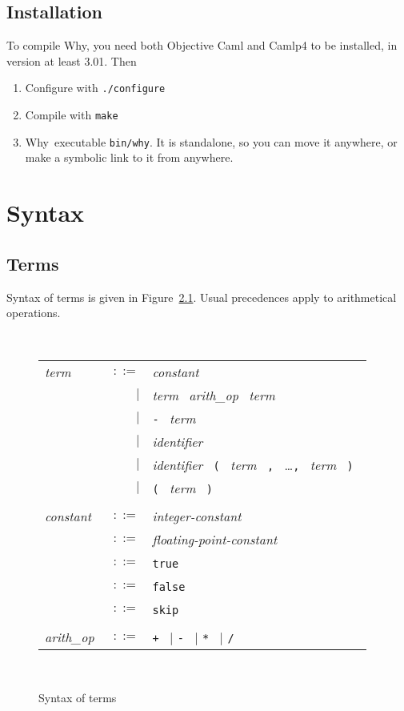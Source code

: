 \documentclass[12pt]{report}
\newcommand{\why}{\textsf{Why}}
\newcommand{\te}[1]{\texttt{#1}~}
\newcommand{\nt}[1]{\textsl{#1}~}
\begin{document}
\section{Installation}

To compile \why, you need both \textsf{Objective Caml} and
\textsf{Camlp4} to be installed, in version at least 3.01.
Then 

\begin{enumerate}
\item Configure with \texttt{./configure}
\item Compile with \texttt{make}
\item \why\ executable \texttt{bin/why}. It is standalone, 
  so you can move it anywhere, or make a symbolic link to it from anywhere.
\end{enumerate}


\chapter{Syntax}
\label{syntax}

\section{Terms}

Syntax of terms is given in Figure~\ref{fig:terms}.
Usual precedences apply to arithmetical operations.

\begin{figure}[htbp]
\begin{center}
\hrulefill\\
\begin{tabular}{lrl}
  \nt{term}
    & $::=$ & \nt{constant} \\
      & $|$ & \nt{term} \nt{arith\_op} \nt{term} \\
      & $|$ & \te{-} \nt{term} \\
      & $|$ & \nt{identifier} \\
      & $|$ & \nt{identifier} 
              \te{(} \nt{term} \te{,} \dots \te{,} \nt{term} \te{)} \\
      & $|$ & \te{(} \nt{term} \te{)} \\
  \\[0.1em]

  \nt{constant}
    & $::=$ & \nt{integer-constant} \\
    & $::=$ & \nt{floating-point-constant} \\
    & $::=$ & \te{true} \\
    & $::=$ & \te{false} \\
    & $::=$ & \te{skip} \\
  \\[0.1em]

  \nt{arith\_op}
    & $::=$ & \te{+} $|$ \te{-} $|$ \te{*} $|$ \te{/}
\end{tabular}\\
\hrulefill
\caption{Syntax of terms}
\label{fig:terms}
\end{center}		
\end{figure}
\end{document}
